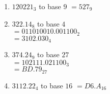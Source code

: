 \documentclass[12pt]{article}
\begin{document}
\begin{enumerate}
\begin{tabular}{l | l | l}
       &

       \begin{tabular}{r c l l}
           $21190 \div 9$  & $=$ & $2354$ & $R4$ \\
           $2354 \div 9$   & $=$ & $261$ & $R5$  \\
           $261 \div 9$    & $=$ & $29$ & $R0$  \\
           $29 \div 9$     & $=$ & $3$ & $R2$  \\
           $3 \div 9$      & $=$ & $0$ & $R3$  \\
       \end{tabular}

       &

       \begin{tabular}{r c l l}
           $9 \times .148834019$ & $=$ & $1 + .339506171$  & \\
           $9 \times .339506171$ & $=$ & $3 + .055555539$  & \\
           $9 \times .055555539$ & $=$ & $0 + .499999851$  & \\
           $9 \times .499999851$ & $=$ & $4 + .499998659$  & round down\\
       \end{tabular}
       
    \end{tabular}


    \item $120221_3$ to base $9$ 
    $= \boxed{527_9}$

    \item $322.14_8$ to base $4$ \\
    $= 011 010 010 . 001 100_2$ \\
    $= \boxed{3102.030_4}$

    \item $374.24_9$ to base $27$ \\
    $= 102111.021100_3 $ \\
    $= \boxed{BD.79_{27}}$

    \item $3112.22_4$ to base $16$
    $= \boxed{D6.A_{16}}$


\end{enumerate}
\end{document}
